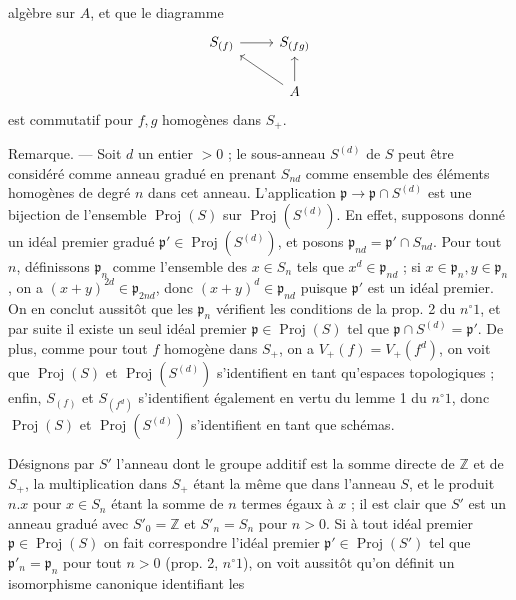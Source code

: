 algèbre sur $A$, et que le diagramme
$$\begin{tikzcd}
S_{(f)} \arrow[r] & S_{(fg)} \\
& A \arrow[u] \arrow[ul]
\end{tikzcd}$$
est commutatif pour $f, g$ homogènes dans $S_+$.

Remarque. — Soit $d$ un entier $> 0$ ; le sous-anneau $S^{(d)}$ de $S$ peut être considéré comme anneau gradué en prenant $S_{nd}$ comme ensemble des éléments homogènes de degré $n$ dans cet anneau. L'application $\mathfrak{p} \to \mathfrak{p} \cap S^{(d)}$ est une bijection de l'ensemble $\operatorname{Proj}(S)$ sur $\operatorname{Proj}(S^{(d)})$. En effet, supposons donné un idéal premier gradué $\mathfrak{p}' \in \operatorname{Proj}(S^{(d)})$, et posons $\mathfrak{p}_{nd} = \mathfrak{p}' \cap S_{nd}$. Pour tout $n$, définissons $\mathfrak{p}_n$ comme l'ensemble des $x \in S_n$ tels que $x^d \in \mathfrak{p}_{nd}$ ; si $x \in \mathfrak{p}_n, y \in \mathfrak{p}_n$, on a $(x+y)^{2d} \in \mathfrak{p}_{2nd}$, donc $(x+y)^d \in \mathfrak{p}_{nd}$ puisque $\mathfrak{p}'$ est un idéal premier. On en conclut aussitôt que les $\mathfrak{p}_n$ vérifient les conditions de la prop. 2 du $n^\circ 1$, et par suite il existe un seul idéal premier $\mathfrak{p} \in \operatorname{Proj}(S)$ tel que $\mathfrak{p} \cap S^{(d)} = \mathfrak{p}'$. De plus, comme pour tout $f$ homogène dans $S_+$, on a $V_+(f) = V_+(f^d)$, on voit que $\operatorname{Proj}(S)$ et $\operatorname{Proj}(S^{(d)})$ s'identifient en tant qu'espaces topologiques ; enfin, $S_{(f)}$ et $S_{(f^d)}$ s'identifient également en vertu du lemme 1 du $n^\circ 1$, donc $\operatorname{Proj}(S)$ et $\operatorname{Proj}(S^{(d)})$ s'identifient en tant que schémas.

Désignons par $S'$ l'anneau dont le groupe additif est la somme directe de $\mathbb{Z}$ et de $S_+$, la multiplication dans $S_+$ étant la même que dans l'anneau $S$, et le produit $n.x$ pour $x \in S_n$ étant la somme de $n$ termes égaux à $x$ ; il est clair que $S'$ est un anneau gradué avec $S'_0 = \mathbb{Z}$ et $S'_n = S_n$ pour $n > 0$. Si à tout idéal premier $\mathfrak{p} \in \operatorname{Proj}(S)$ on fait correspondre l'idéal premier $\mathfrak{p}' \in \operatorname{Proj}(S')$ tel que $\mathfrak{p}'_n = \mathfrak{p}_n$ pour tout $n > 0$ (prop. 2, $n^\circ 1$), on voit aussitôt qu'on définit un isomorphisme canonique identifiant les

\newpage


